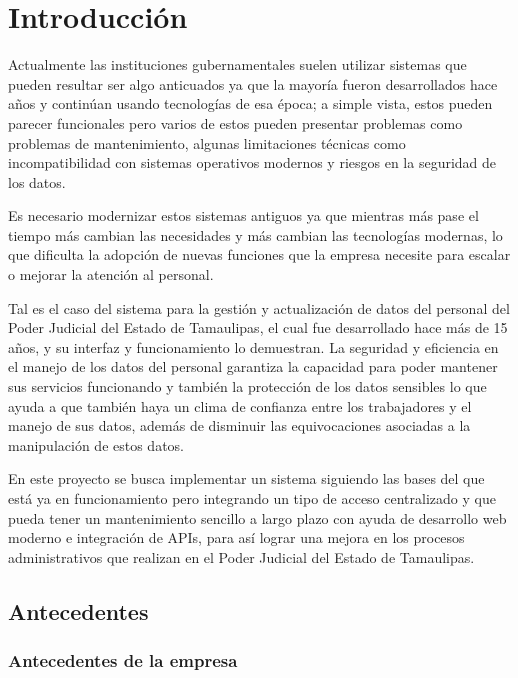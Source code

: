 \section{Introducción}
\label{ch:introduccion}

Actualmente las instituciones gubernamentales suelen utilizar sistemas que pueden resultar ser algo anticuados ya que la mayoría fueron desarrollados hace años y continúan usando tecnologías de esa época; a simple vista, estos pueden parecer funcionales pero varios de estos pueden presentar problemas como problemas de mantenimiento, algunas limitaciones técnicas como incompatibilidad con sistemas operativos modernos y riesgos en la seguridad de los datos. 

Es necesario modernizar estos sistemas antiguos ya que mientras más pase el tiempo más cambian las necesidades y más cambian las tecnologías modernas, lo que dificulta la adopción de nuevas funciones que la empresa necesite para escalar o mejorar la atención al personal.

Tal es el caso del sistema para la gestión y actualización de datos del personal del Poder Judicial del Estado de Tamaulipas, el cual fue desarrollado hace más de 15 años, y su interfaz y funcionamiento lo demuestran. La seguridad y eficiencia en el manejo de los datos del personal garantiza la capacidad para poder mantener sus servicios funcionando y también la protección de los datos sensibles lo que ayuda a que también haya un clima de confianza entre los trabajadores y el manejo de sus datos, además de disminuir las equivocaciones asociadas a la manipulación de estos datos.

En este proyecto se busca implementar un sistema siguiendo las bases del que está ya en funcionamiento pero integrando un tipo de acceso centralizado y que pueda tener un mantenimiento sencillo a largo plazo con ayuda de desarrollo web moderno e integración de APIs, para así lograr una mejora en los procesos administrativos que realizan en el Poder Judicial del Estado de Tamaulipas.
\subsection{Antecedentes}
\label{sec:antecedentes}

\subsubsection{Antecedentes de la empresa}
\label{sec:antecedentes_empresa}

